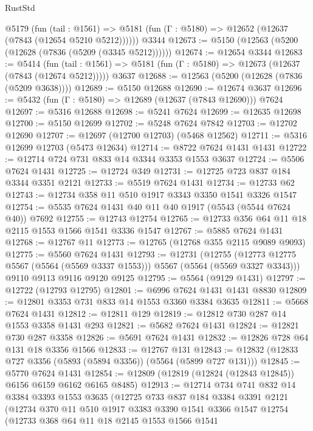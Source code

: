 \begin{lexlean}{RustStd}
\begin{coremodule}
    @5179
      (fun (tail : @1561) =>
      @5181 (fun (Γ : @5180) => @12652 (@12637 (@7843 (@12654 @5210 @5212))))))
    @3344
@12673 := @5150 (@12563 (@5200 (@12628 (@7836 (@5209 (@3345 @5212))))))
@12674 := @12654 @3344
@12683 := @5414
    (fun (tail : @1561) => @5181 (fun (Γ : @5180) => @12673 (@12637 (@7843 (@12674 @5212)))))
    @3637
@12688 := @12563 (@5200 (@12628 (@7836 (@5209 @3638))))
@12689 := @5150 @12688
@12690 := @12674 @3637
@12696 := @5432 (fun (Γ : @5180) => @12689 (@12637 (@7843 @12690))) @7624
@12697 := @5316 @12688
@12698 := @5241 @7624
@12699 := @12635 @12698
@12700 := @5150 @12699
@12702 := @5248 @7624 @7842
@12703 := @12702 @12690
@12707 := @12697 (@12700 @12703) (@5468 @12562)
@12711 := @5316 @12699 @12703 (@5473 @12634)
@12714 := @8722 @7624 @1431 @1431
@12722 := @12714 @724 @731 @833 @14 @3344 @3353 @1553 @3637
@12724 := @5506 @7624 @1431
@12725 := @12724 @349
@12731 := @12725 @723 @837 @184 @3344 @3351 @2121
@12733 := @5519 @7624 @1431
@12734 := @12733 @62
@12743 := @12734 @358 @11 @510 @1917 @3343 @3350 @1541 @3326 @1547
@12754 := @5535 @7624 @1431 @40 @11 @40 @1917 (@5543 (@5544 @7624 @40)) @7692
@12755 := @12743 @12754
@12765 := @12733 @356 @64 @11 @18 @2115 @1553 @1566 @1541 @3336 @1547
@12767 := @5885 @7624 @1431
@12768 := @12767 @11
@12773 := @12765 (@12768 @355 @2115 @9089 @9093)
@12775 := @5560 @7624 @1431
@12793 := @12731
    (@12755 (@12773 @12775 @5567 (@5564 (@5569 @3337 @1553))) @5567 (@5564 (@5569 @3327 @3343)))
    @9110
    @9113
    @9116
    @9120
    @9125
@12795 := @5564 (@9129 @1431)
@12797 := @12722 (@12793 @12795)
@12801 := @6996 @7624 @1431 @1431 @8830
@12809 := @12801 @3353 @731 @833 @14 @1553 @3360 @3384 @3635
@12811 := @5668 @7624 @1431
@12812 := @12811 @129
@12819 := @12812 @730 @287 @14 @1553 @3358 @1431 @293
@12821 := @5682 @7624 @1431
@12824 := @12821 @730 @287 @3358
@12826 := @5691 @7624 @1431
@12832 := @12826 @728 @64 @131 @18 @3356 @1566
@12833 := @12767 @131
@12843 := @12832 (@12833 @727 @3356 (@5893 (@5894 @3356)) (@5564 (@5899 @727 @131)))
@12845 := @5770 @7624 @1431
@12854 := @12809 (@12819 (@12824 (@12843 @12845)) @6156 @6159 @6162 @6165 @8485)
@12913 := @12714
    @734
    @741
    @832
    @14
    @3384
    @3393
    @1553
    @3635
    (@12725
      @733
      @837
      @184
      @3384
      @3391
      @2121
      (@12734
        @370
        @11
        @510
        @1917
        @3383
        @3390
        @1541
        @3366
        @1547
        @12754
        (@12733
          @368
          @64
          @11
          @18
          @2145
          @1553
          @1566
          @1541

\end{coremodule}
\end{lexlean}
